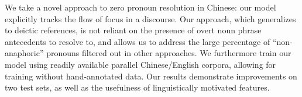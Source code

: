 We take a novel approach to zero pronoun resolution in Chinese: our model explicitly tracks the flow of focus in a discourse. Our approach, which generalizes to deictic references, is not reliant on the presence of overt noun phrase antecedents to resolve to, and allows us to address the large percentage of ``non-anaphoric'' pronouns filtered out in other approaches. We furthermore train our model using readily available parallel Chinese/English corpora, allowing for training without hand-annotated data. Our results demonstrate improvements on two test sets, as well as the usefulness of linguistically motivated features.
